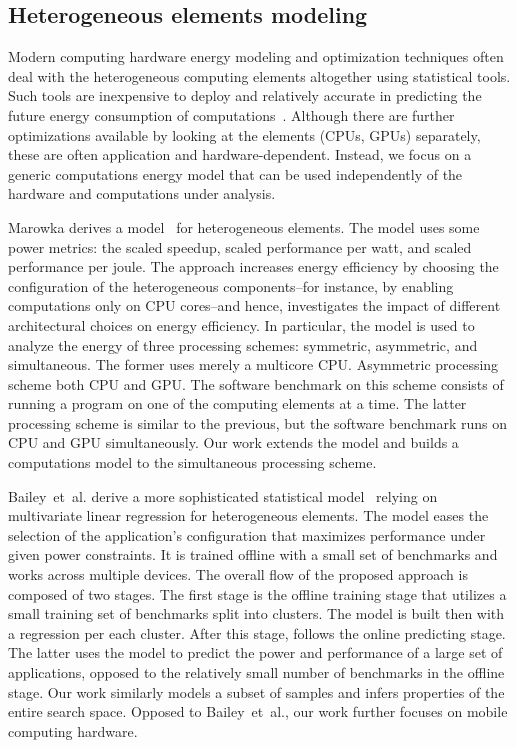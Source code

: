 \subsection{Heterogeneous elements modeling}
\label{sec:soa-ene-hete}

Modern computing hardware energy modeling and optimization techniques often deal with the heterogeneous computing elements altogether using statistical tools. Such tools are inexpensive to deploy and relatively accurate in predicting the future energy consumption of computations~\citep{bailey2014adaptive}. Although there are further optimizations available by looking at the elements (CPUs, GPUs) separately, these are often application and hardware-dependent. Instead, we focus on a generic computations energy model that can be used independently of the hardware and computations under analysis. 

Marowka derives a model~\citep{marowka2017energy} for heterogeneous elements. The model uses some power metrics: the scaled speedup, scaled performance per watt, and scaled performance per joule. The approach increases energy efficiency by choosing the configuration of the heterogeneous components--for instance, by enabling computations only on CPU cores--and hence, investigates the impact of different architectural choices on energy efficiency. In particular, the model is used to analyze the energy of three processing schemes: symmetric, asymmetric, and simultaneous. The former uses merely a multicore CPU. Asymmetric processing scheme both CPU and GPU. The software benchmark on this scheme consists of running a program on one of the computing elements at a time. The latter processing scheme is similar to the previous, but the software benchmark runs on CPU and GPU simultaneously. Our work extends the model and builds a computations model to the simultaneous processing scheme.

Bailey~et~al. derive a more sophisticated statistical model~\citep{bailey2014adaptive} relying on multivariate linear regression for heterogeneous elements. The model eases the selection of the application's configuration that maximizes performance under given power constraints. It is trained offline with a small set of benchmarks and works across multiple devices. The overall flow of the proposed approach is composed of two stages. The first stage is the offline training stage that utilizes a small training set of benchmarks split into clusters. The model is built then with a regression per each cluster. After this stage, follows the online predicting stage. The latter uses the model to predict the power and performance of a large set of applications, opposed to the relatively small number of benchmarks in the offline stage. Our work similarly models a subset of samples and infers properties of the entire search space. Opposed to Bailey~et~al., our work further focuses on mobile computing hardware.

